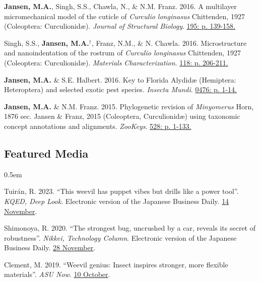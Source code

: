 \documentclass[12pt,a4paper]{article}
\begin{document}
\begin{description}
	\item \textbf{Jansen, M.A.}, Singh, S.S., Chawla, N., \& N.M. Franz. 2016. A multilayer micromechanical model of the cuticle of \textit{Curculio longinasus} Chittenden, 1927 (Coleoptera: Curculionid\ae). \textit{Journal of Structural Biology}. \href{http://www.sciencedirect.com/science/article/pii/S1047847716300922}{195: p. 139-158.}
	
	\item Singh, S.S., \textbf{Jansen, M.A.}$^\dagger$, Franz, N.M., \& N. Chawla. 2016. Microstructure and nanoindentation of the rostrum of \textit{Curculio longinasus} Chittenden, 1927 (Coleoptera: Curculionid\ae). \textit{Materials Characterization}. \href{http://www.sciencedirect.com/science/article/pii/S1044580316301619}{118: p. 206-211.}
	
	\item \textbf{Jansen, M.A.} \& S.E. Halbert. 2016. Key to Florida Alydid{\ae} (Hemiptera: Heteroptera) and selected exotic pest species. \textit{Insecta Mundi}. \href{http://journals.fcla.edu/mundi/article/view/87952/84644}{0476: p. 1-14.}
	
	\item \textbf{Jansen, M.A.} \& N.M. Franz. 2015. Phylogenetic revision of \textit{Minyomerus} Horn, 1876 sec. Jansen \& Franz, 2015 (Coleoptera, Curculionid\ae) using taxonomic concept annotations and alignments. \textit{ZooKeys}. \href{http://zookeys.pensoft.net/articles.php?id=6001}{528: p. 1-133.}
\end{description}

\subsection*{Featured Media}
\begin{description}
	\itemsep0.5em
	\item Tuir\'{a}n, R. 2023. ``This weevil has puppet vibes but drills like a power tool''. \textit{KQED, Deep Look}. Electronic version of the Japanese Business Daily. \href{https://www.kqed.org/science/1985068/this-weevil-has-puppet-vibes-but-drills-like-a-power-tool}{14 November}.
	\item Shimonoya, R. 2020. ``The strongest bug, uncrushed by a car, reveals its secret of robustness''. \textit{Nikkei, Technology Column}. Electronic version of the Japanese Business Daily. \href{https://www.nikkei.com/article/DGXMZO66746060X21C20A1MY1000/}{28 November}.
	\item Clement, M. 2019. ``Weevil genius: Insect inspires stronger, more flexible materials''. \textit{ASU Now}. \href{https://asunow.asu.edu/20191010-discoveries-asu-engineering-weevil-inspires-stronger-flexible-materials}{10 October}.
	
\end{description}
\end{document}

